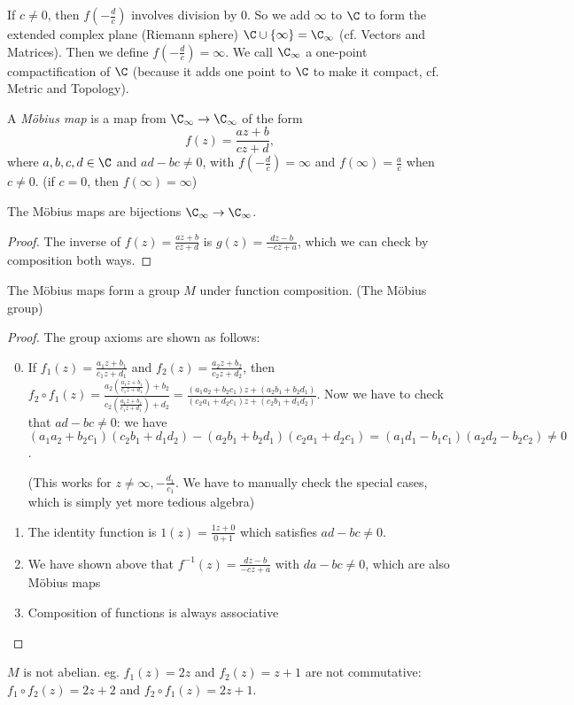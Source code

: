 \documentclass[a4paper]{article}
\begin{document}
If $c\not=0$, then $f(-\frac{d}{c})$ involves division by 0. So we add $\infty$ to $\C$ to form the extended complex plane (Riemann sphere) $\C\cup \{\infty\}= \C_\infty$ (cf. Vectors and Matrices). Then we define $f(-\frac{d}{c}) = \infty$. We call $\C_\infty$ a one-point compactification of $\C$ (because it adds one point to $\C$ to make it compact, cf. Metric and Topology).

\begin{defi}
  A \emph{M\"obius map} is a map from $\C_\infty \to \C_\infty$ of the form
  \[
    f(z) = \frac{az + b}{cz + d},
  \]
  where $a, b, c, d\in \C$ and $ad - bc\not= 0$, with $f(-\frac{d}{c}) = \infty$ and $f(\infty) = \frac{a}{c}$ when $c\not= 0$. (if $c = 0$, then $f(\infty)=\infty$)
\end{defi}

\begin{lemma}
  The M\"obius maps are bijections $\C_\infty \to \C_\infty$.
\end{lemma}

\begin{proof}
  The inverse of $f(z) = \frac{az + b}{cz+ d}$ is $g(z) = \frac{dz - b}{-cz + a}$, which we can check by composition both ways.
\end{proof}

\begin{prop}
  The M\"obius maps form a group $M$ under function composition. (The M\"obius group)
\end{prop}
\begin{proof}
  The group axioms are shown as follows:
  \begin{enumerate}[label=\arabic{*}.]
      \setcounter{enumi}{-1}
    \item If $f_1(z) = \frac{a_1z + b_1}{c_1z + d_1}$ and $f_2(z) = \frac{a_2z + b_2}{c_2 z + d_2}$, then $\displaystyle f_2\circ f_1 (z) = \frac{a_2\left(\frac{a_1z + b_1}{c_1z + d_1}\right) + b_2}{c_2\left(\frac{a_1z + b_1}{c_1z + d_1}\right) + d_2} = \frac{(a_1a_2 + b_2c_1)z + (a_2b_1 + b_2d_1)}{(c_2a_1 + d_2c_1)z + (c_2b_1 + d_1d_2)}$. Now we have to check that $ad - bc \not = 0$: we have $(a_1a_2 + b_2c_1)(c_2b_1 + d_1d_2) - (a_2b_1 + b_2d_1)(c_2a_1 + d_2c_1) = (a_1d_1 - b_1c_1)(a_2d_2 - b_2c_2)\not =0 $.

      (This works for $z\not= \infty, -\frac{d_1}{c_1}$. We have to manually check the special cases, which is simply yet more tedious algebra)
    \item The identity function is $1(z) = \frac{1z + 0}{0 + 1}$ which satisfies $ad - bc \not= 0$.
    \item We have shown above that $f^{-1}(z) = \frac{dz - b}{-cz + a}$ with $da - bc\not= 0$, which are also M\"obius maps
    \item Composition of functions is always associative
  \end{enumerate}
\end{proof}
$M$ is not abelian. eg. $f_1(z) = 2z$ and $f_2(z) = z + 1$ are not commutative: $f_1\circ f_2(z) = 2z+2$ and $f_2\circ f_1(z) = 2z + 1$.
\end{document}
